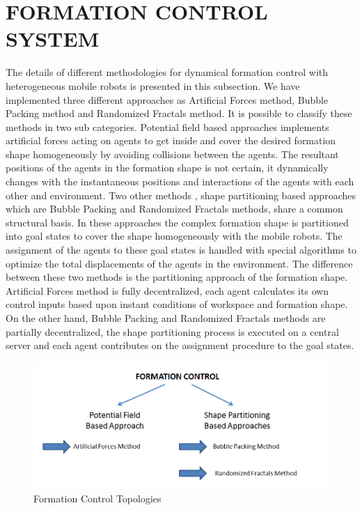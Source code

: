 \section{FORMATION CONTROL SYSTEM} \label{formation_control_ref}
The details of different methodologies for dynamical formation control with heterogeneous mobile robots is presented in this subsection. We have implemented three different approaches as Artificial Forces method, Bubble Packing method and Randomized Fractals method. It is possible to classify these methods in two sub categories. Potential field based approaches implements artificial forces acting on agents to get inside and cover the desired formation shape homogeneously by avoiding collisions between the agents. The resultant positions of the agents in the formation shape is not certain, it dynamically changes with the instantaneous positions and interactions of the agents with each other and environment. Two other methods , shape partitioning based approaches which are Bubble Packing and Randomized Fractals methods, share a common structural basis. In these approaches the complex formation shape is partitioned into goal states to cover the shape homogeneously with the mobile robots. The assignment of the agents to these goal states is handled with special algorithms to optimize the total displacements of the agents in the environment. The difference between these two methods is the partitioning approach of the formation shape. Artificial Forces method is fully decentralized, each agent calculates its own control inputs based upon instant conditions of workspace and formation shape. On the other hand, Bubble Packing and Randomized Fractals methods are partially decentralized, the shape partitioning process is executed on a central server and each agent contributes on the assignment procedure to the goal states. 
		
\begin{figure}[H]
\caption{Formation Control Topologies} \label{formation_controlin_figi}
\centering
\includegraphics[scale = 0.60]{methods}
\end{figure}	

